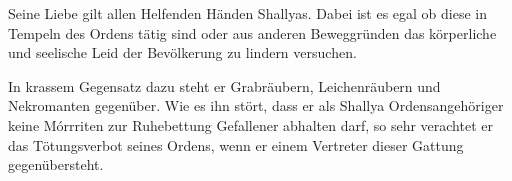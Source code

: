 
Seine Liebe gilt allen Helfenden Händen Shallyas. Dabei ist es egal ob diese in Tempeln des Ordens tätig sind oder aus anderen Beweggründen das körperliche und seelische Leid der Bevölkerung zu lindern versuchen.

In krassem Gegensatz dazu steht er Grabräubern, Leichenräubern und Nekromanten gegenüber. Wie es ihn stört, dass er als Shallya Ordensangehöriger keine Mórrriten zur Ruhebettung Gefallener abhalten darf, so sehr verachtet er das Tötungsverbot seines Ordens, wenn er einem Vertreter dieser Gattung gegenübersteht.
